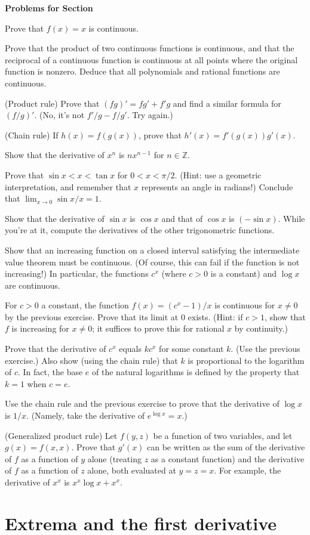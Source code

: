 \documentclass[12pt]{report}
\def\ZZ{\mathbb{Z}}
\def\ii{\item}
\newcounter{exc}
\numberwithin{exc}{section}
\newenvironment{exer}{\vspace{0.1in}
\noindent \textbf{Problems for Section~\thesection} \vspace{0.1in}
\begin{list}{\arabic{exc}.}{\usecounter{exc}}}{\end{list}}
\begin{document}
\begin{exer}
\ii
Prove that $f(x) = x$ is continuous.
\ii
Prove that the product of two continuous functions is continuous, and 
that the reciprocal of a continuous function is continuous at all 
points where the original function is nonzero.
Deduce that all polynomials and rational functions are continuous.
\ii (Product rule)
Prove that $(fg)' = fg' + f'g$ and find a similar formula for $(f/g)'$.
(No, it's not $f'/g - f/g'$. Try again.)
\ii (Chain rule)
If $h(x) = f(g(x))$, prove that $h'(x) = f'(g(x)) g'(x)$.
\ii
Show that the derivative of $x^{n}$ is $n x^{n-1}$ for $n \in \ZZ$.
\ii
Prove that $\sin x < x < \tan x$ for $0 < x < \pi/2$. (Hint: use a 
geometric interpretation, and remember that $x$ represents an angle 
in radians!) Conclude that $\lim_{x \to 0} \sin x / x = 1$.
\ii
Show that the derivative of $\sin x$ is $\cos x$ and that of $\cos x$ 
is $(-\sin x)$. While you're at it, compute the derivatives of the 
other trigonometric functions.
\ii
Show that an increasing function on a closed interval satisfying the 
intermediate value theorem must be continuous. (Of course, this can 
fail if the function is not increasing!) In particular, the 
functions $c^{x}$ (where $c>0$ is a constant) and $\log x$ are continuous.
\ii
For $c > 0$ a constant, the function $f(x) = (c^{x} - 1)/x$ is continuous 
for $x \neq 0$ by the previous exercise. Prove that its limit at 0 
exists. (Hint: if $c>1$, show that $f$ is increasing for $x \neq 0$; 
it suffices to prove this for rational $x$ by continuity.)
\ii
Prove that the derivative of $c^{x}$ equals $k c^{x}$ for some 
constant $k$. (Use the previous exercise.) Also show (using the chain rule) 
that $k$ is proportional to the 
logarithm of $c$. In fact, the base $e$ of the natural logarithms is 
defined by the property that $k=1$ when $c=e$.
\ii
Use the chain rule and the previous exercise to prove that the 
derivative of $\log x$ is $1/x$. (Namely, take the derivative of 
$e^{\log x} = x$.)
\ii (Generalized product rule)
Let $f(y,z)$ be a function of two variables, and let $g(x) = f(x,x)$. 
Prove that $g'(x)$ can be written as the sum of the derivative of $f$ 
as a function of $y$ alone (treating $z$ as a constant function) and 
the derivative of $f$ as a function of $z$ alone, both evaluated at 
$y=z=x$. For example, the derivative of $x^x$ is $x^x \log x + x^x$.
\end{exer}

\section{Extrema and the first derivative}
\end{document}
